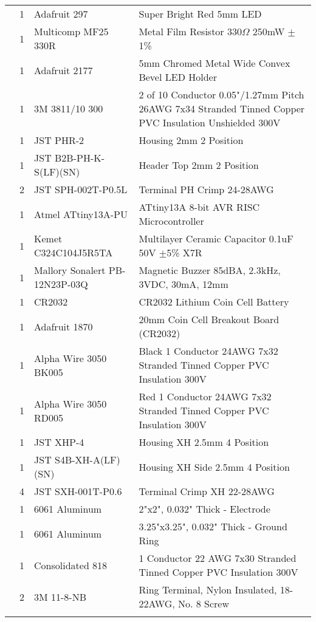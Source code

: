 \begin{longtabu}{X[3,c,m] X[1,c,m] X[3,c,m] X[5,l,m]}
   & 1 & Adafruit 297 & Super Bright Red 5mm LED \\
  & 1 & Multicomp MF25 330R & Metal Film Resistor 330$\Omega$ 250mW $\pm$1\% \\
  & 1 & Adafruit 2177 & 5mm Chromed Metal Wide Convex Bevel LED Holder \\
  & 1 & 3M 3811/10 300 & 2 of 10 Conductor 0.05"/1.27mm Pitch 26AWG 7x34 Stranded Tinned Copper PVC Insulation Unshielded 300V \\
  & 1 & JST PHR-2 & Housing 2mm 2 Position \\
  & 1 & JST B2B-PH-K-S(LF)(SN) & Header Top 2mm 2 Position \\
  & 2 & JST SPH-002T-P0.5L & Terminal PH Crimp 24-28AWG \\
  & 1 & Atmel ATtiny13A-PU & ATtiny13A 8-bit AVR RISC Microcontroller \\
  & 1 & Kemet C324C104J5R5TA & Multilayer Ceramic Capacitor 0.1uF 50V $\pm$5\% X7R \\ \mrule

   & 1 & Mallory Sonalert PB-12N23P-03Q & Magnetic Buzzer 85dBA, 2.3kHz, 3VDC, 30mA, 12mm \\ \mrule

   & 1 & CR2032 & CR2032 Lithium Coin Cell Battery \\
  & 1 & Adafruit 1870 & 20mm Coin Cell Breakout Board (CR2032) \\
  & 1 & Alpha Wire 3050 BK005 & Black 1 Conductor 24AWG 7x32 Stranded Tinned Copper PVC Insulation 300V \\
  & 1 & Alpha Wire 3050 RD005 & Red 1 Conductor 24AWG 7x32 Stranded Tinned Copper PVC Insulation 300V \\
  & 1 & JST XHP-4 & Housing XH 2.5mm 4 Position \\
  & 1 & JST S4B-XH-A(LF)(SN) & Housing XH Side 2.5mm 4 Position \\
  & 4 & JST SXH-001T-P0.6 & Terminal Crimp XH 22-28AWG \\ \mrule

   & 1 & 6061 Aluminum & 2"x2", 0.032" Thick - Electrode \\
  & 1 & 6061 Aluminum & 3.25"x3.25", 0.032" Thick - Ground Ring \\
  & 1 & Consolidated 818 & 1 Conductor 22 AWG 7x30 Stranded Tinned Copper PVC Insulation 300V \\
  & 2 & 3M 11-8-NB & Ring Terminal, Nylon Insulated, 18-22AWG, No. 8 Screw \\ \mrule


\end{longtabu}
